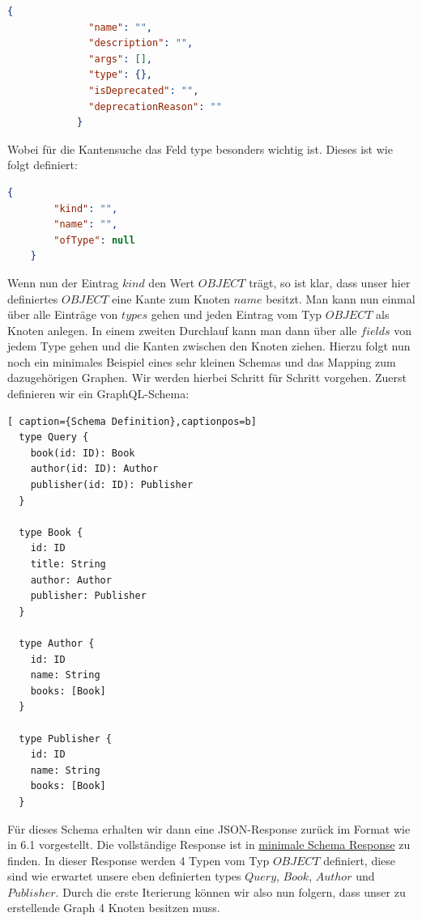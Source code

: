 \begin{lstlisting}[language=json, caption={Type-Field},captionpos=b]
            {
              "name": "",
              "description": "",
              "args": [],
              "type": {},
              "isDeprecated": "",
              "deprecationReason": ""
            }
\end{lstlisting}

Wobei für die Kantensuche das Feld type besonders wichtig ist.
Dieses ist wie folgt definiert:

\begin{lstlisting}[language=json, caption={Type-Field},captionpos=b]
    {
        "kind": "",
        "name": "",
        "ofType": null
    }
\end{lstlisting}

Wenn nun der Eintrag $kind$ den Wert $OBJECT$ trägt, so ist klar, dass unser hier definiertes $OBJECT$ eine Kante zum
Knoten $name$ besitzt.
Man kann nun einmal über alle Einträge von $types$ gehen und jeden Eintrag vom Typ $OBJECT$ als Knoten anlegen.
In einem zweiten Durchlauf kann man dann über alle $fields$ von jedem Type gehen und die Kanten zwischen den Knoten ziehen.
Hierzu folgt nun noch ein minimales Beispiel eines sehr kleinen Schemas und das Mapping zum dazugehörigen Graphen.
Wir werden hierbei Schritt für Schritt vorgehen.
Zuerst definieren wir ein GraphQL-Schema:

\begin{lstlisting}[ caption={Schema Definition},captionpos=b]
  type Query {
    book(id: ID): Book
    author(id: ID): Author
    publisher(id: ID): Publisher
  }

  type Book {
    id: ID
    title: String
    author: Author
    publisher: Publisher
  }

  type Author {
    id: ID
    name: String
    books: [Book]
  }

  type Publisher {
    id: ID
    name: String
    books: [Book]
  }
\end{lstlisting}

Für dieses Schema erhalten wir dann eine JSON-Response zurück im Format wie in 6.1 vorgestellt.
Die vollständige Response ist in \hyperref[minimal-schema-response]{minimale Schema Response} zu finden.
In dieser Response werden 4 Typen vom Typ $OBJECT$ definiert, diese sind wie erwartet unsere eben definierten types
$Query$, $Book$, $Author$ und $Publisher$.
Durch die erste Iterierung können wir also nun folgern, dass unser zu erstellende Graph 4 Knoten besitzen muss.

